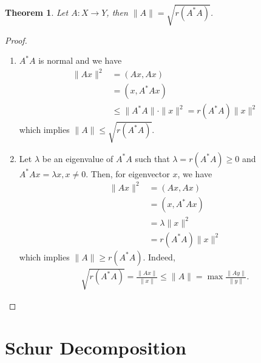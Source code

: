 \documentclass[11pt]{book}
\newtheorem{theorem}{Theorem}[section]
\theoremstyle{definition}
\numberwithin{equation}{subsection}
\begin{document}
\begin{theorem}
Let $A:X\to Y$, then $\|A\| = \sqrt{r(A^*A)}$.
\end{theorem}
\begin{proof}
~\begin{enumerate}[label=(\arabic*)]
    \item $A^*A$ is normal and we have
    \begin{align*}
        \|Ax\|^2 & = (Ax, Ax) \\
        & = (x, A^*Ax) \\
        & \leq \|A^*A\|\cdot \|x\|^2 = r(A^*A) \|x\|^2
    \end{align*}
    which implies $\|A\| \leq \sqrt{r(A^*A)}$.
    \item Let $\lambda$ be an eigenvalue of $A^*A$ such that $\lambda = r(A^*A) \geq 0$ and $A^*Ax = \lambda x, x\neq 0$. Then, for eigenvector $x$, we have
    \begin{align*}
        \|Ax\|^2 & = (Ax,Ax) \\
        & = (x,A^*Ax) \\
        & = \lambda \|x\|^2 \\
        & = r(A^*A) \|x\|^2 
    \end{align*}
    which implies $\|A\| \geq r(A^*A)$. Indeed, 
    \begin{align*}
        \sqrt{r(A^*A)} = \frac{\|Ax\|}{\|x\|} \leq \|A\| = \max \frac{\|Ay\|}{\|y\|}.
    \end{align*}
\end{enumerate}
\end{proof}

\medskip

\section{Schur Decomposition}
\end{document}
